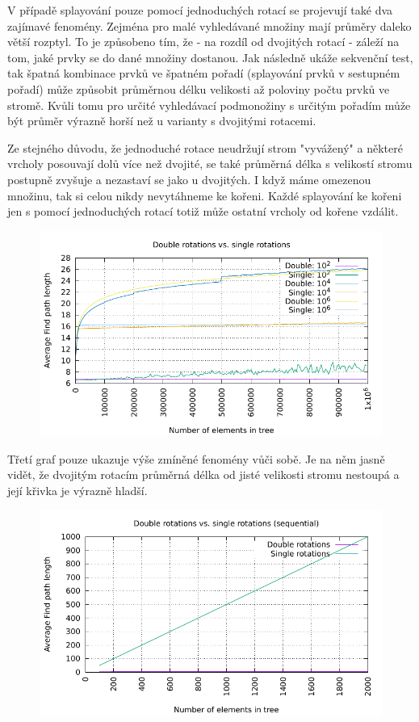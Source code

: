 \documentclass[12pt,a4paper]{report}
\begin{document}
V případě splayování pouze pomocí jednoduchých rotací se projevují také dva zajímavé fenomény. Zejména pro malé vyhledávané množiny mají průměry  daleko větší rozptyl. To je způsobeno tím, že - na rozdíl od dvojitých rotací - záleží na tom, jaké prvky se do dané množiny dostanou. Jak následně ukáže sekvenční test, tak špatná kombinace prvků ve špatném pořadí (splayování prvků v sestupném pořadí) může způsobit průměrnou délku velikosti až poloviny počtu prvků ve stromě. Kvůli tomu pro určité vyhledávací podmonožiny s určitým pořadím může být průměr výrazně horší než u varianty s dvojitými rotacemi.

Ze stejného důvodu, že jednoduché rotace neudržují strom "vyvážený" a některé vrcholy posouvají dolů více než dvojité, se také průměrná délka s velikostí stromu postupně zvyšuje a nezastaví se jako u dvojitých. I když máme omezenou množinu, tak si celou nikdy nevytáhneme ke kořeni. Každé splayování ke kořeni jen s pomocí jednoduchých rotací totiž může ostatní vrcholy od kořene vzdálit. 

	\begin{figure}[h]	
		\centering	
		\includegraphics[scale=0.75]{graph_3}		
	\end{figure}

Třetí graf pouze ukazuje výše zmíněné fenomény vůči sobě. Je na něm jasně vidět, že dvojitým rotacím průměrná délka od jisté velikosti stromu nestoupá a její křivka je výrazně hladší. 


	\begin{figure}[h]	
		\centering	
		\includegraphics[scale=0.75]{graph_4}		
	\end{figure}
\end{document}
